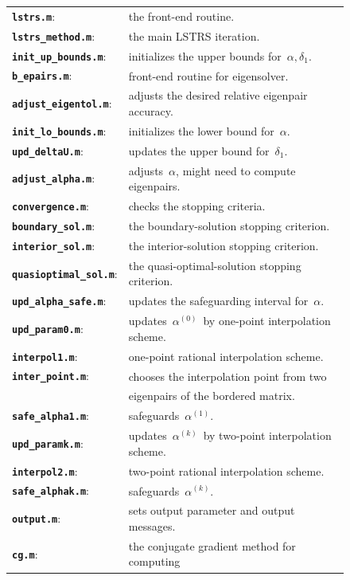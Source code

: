 \documentclass[acmtoms]{acmtrans2m}
\newcommand{\deltao}{\delta_{1}}
\newcommand{\alphaz}{\alpha^{(0)}}
\newcommand{\alphaone}{\alpha^{(1)}}
\newcommand{\alphak}{\alpha^{(k)}}
\begin{document}
\begin{figure}[h!tbp]
\begin{tabular}{ll}
{\tt\bf lstrs.m}: &the front-end routine.\\
{\tt\bf lstrs\_method.m}:& the main LSTRS iteration.\\
{\tt\bf init\_up\_bounds.m}: & initializes the upper bounds for\ $\alpha, \deltao$.\\
{\tt\bf b\_epairs.m}: & front-end routine for eigensolver.\\
{\tt\bf adjust\_eigentol.m}: & adjusts the desired relative eigenpair accuracy.\\
{\tt\bf init\_lo\_bounds.m}: & initializes the lower bound for\ $\alpha$.\\
{\tt\bf upd\_deltaU.m}: & updates the upper bound for\ $\deltao$.\\
{\tt\bf adjust\_alpha.m}: & adjusts\ $\alpha$, might need to compute eigenpairs.\\
{\tt\bf convergence.m}: & checks the stopping criteria.\\
{\tt\bf boundary\_sol.m}: & the boundary-solution stopping criterion.\\
{\tt\bf interior\_sol.m}: & the interior-solution stopping criterion.\\
{\tt\bf quasioptimal\_sol.m}: & the quasi-optimal-solution stopping criterion.\\
{\tt\bf upd\_alpha\_safe.m}: & updates the safeguarding interval for\ $\alpha$.\\
{\tt\bf upd\_param0.m}: & updates\ $\alphaz$\ by one-point interpolation scheme.\\
{\tt\bf interpol1.m}: & one-point rational interpolation scheme.\\
{\tt\bf inter\_point.m}: & chooses the interpolation point from two\\
& eigenpairs of the bordered matrix.\\
{\tt\bf safe\_alpha1.m}: & safeguards\ $\alphaone$.\\
{\tt\bf upd\_paramk.m}: & updates\ $\alphak$\ by two-point interpolation scheme.\\
{\tt\bf interpol2.m}: & two-point rational interpolation scheme.\\
{\tt\bf safe\_alphak.m}: & safeguards\ $\alphak$.\\
{\tt\bf output.m}: & sets output parameter and output messages.\\
{\tt\bf cg.m}: & the conjugate gradient method for computing \\

\end{tabular}
\end{figure}
\end{document}
